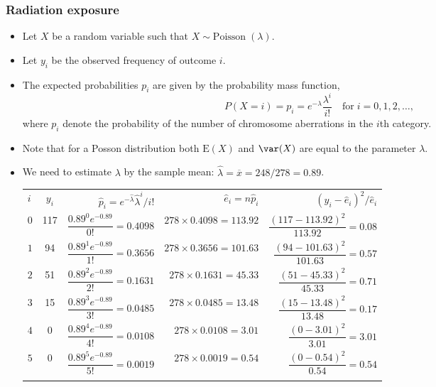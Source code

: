 \documentclass[a4paper]{article}\usepackage[]{graphicx}\usepackage[]{xcolor}
\begin{document}
\subsubsection{Radiation exposure}
\begin{itemize}
	\item Let \( X \) be a random variable such that \( X \sim \text{Poisson}\;(\lambda) \).
	\item Let \( y_i \) be the observed frequency of outcome \( i \).
	\item The expected probabilities \( p_i \) are given by the probability mass function,
	\[
		P(X = i) = p_i = e^{-\lambda} \frac{\lambda^i}{i!} \quad\text{for}\; i = 0,1,2,\dotsc,
	\]
	where \( p_i \) denote the probability of the number of chromosome aberrations in the \( i \)th category.
	\item Note that for a Posson distribution both \( \mathrm{\mathrm{E}}(X) \) and \( \var(X) \) are equal to the parameter \( \lambda \).
	\item We need to estimate \( \lambda \) by the sample mean: \( \hat{\lambda} = \overline{x} = 248 / 278 = 0.89 \).
	\begin{table}[H]
		\centering
		\begin{tabular}{@{}l|crrr@{}}
		\toprule
		\( i \) & \( y_i \) &  \( \hat p_i=e^{- \hat{\lambda}}\hat{\lambda}^i /i! \) & \( \hat{e}_i = n\hat{p}_i \) & \( (y_i-\hat{e}_{i})^2/\hat{e}_{i} \) \\ \addlinespace[0.5em] \midrule  
		\( 0 \) &  117 &  \( \dfrac{0.89^0 e^{-0.89}}{0!} = 0.4098 \) & \( 278 \times 0.4098 = 113.92 \) & \( \dfrac{(117-113.92)^2}{113.92} = 0.08 \)  \\  \addlinespace[0.5em] 
		\( 1 \) &  94  &  \( \dfrac{0.89^1 e^{-0.89}}{1!} = 0.3656 \) & \( 278 \times 0.3656 = 101.63 \) & \( \dfrac{(94-101.63)^2}{101.63} = 0.57 \)    \\  \addlinespace[0.5em]
		\( 2 \) &  51  &  \( \dfrac{0.89^2 e^{-0.89}}{2!} = 0.1631 \) & \( 278 \times 0.1631 = 45.33 \) & \( \dfrac{(51-45.33)^2}{45.33} = 0.71 \)  \\ \addlinespace[0.5em]   
		\( 3 \) &    15  &  \( \dfrac{0.89^3 e^{-0.89}}{3!} = 0.0485 \) & \( 278 \times 0.0485 = 13.48 \) & \( \dfrac{(15-13.48)^2}{13.48} = 0.17 \)  \\ \addlinespace[0.5em]   
		\( 4 \) &    0     &  \( \dfrac{0.89^4 e^{-0.89}}{4!} = 0.0108 \) & \( 278 \times 0.0108 = 3.01 \) & \( \dfrac{(0-3.01)^2}{3.01} = 3.01 \)  \\ \addlinespace[0.5em]  
		\( 5 \) &    0     &  \( \dfrac{0.89^5 e^{-0.89}}{5!} = 0.0019 \)& \( 278 \times 0.0019 = 0.54 \) & \( \dfrac{(0-0.54)^2}{0.54} = 0.54 \)  \\ \addlinespace[0.5em]  

\end{tabular}
\end{table}
\end{itemize}
\end{document}
